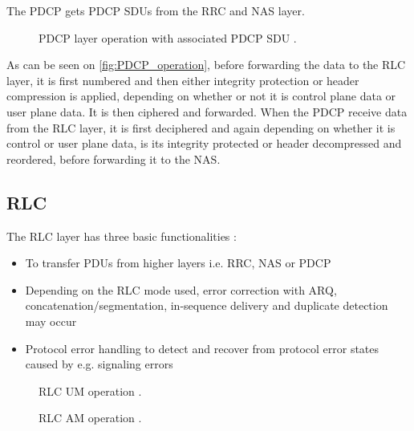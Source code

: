 The \gls{PDCP} gets \gls{PDCP} \gls{SDU}s from the \gls{RRC} and \gls{NAS} layer. 

\begin{figure}[H]
\centering
\resizebox{0.8\textwidth}{!}{
}
\caption{\gls{PDCP} layer operation with associated \gls{PDCP} \gls{SDU} \citep[fig. 6.12]{book_LTE_for_UMTS}.}
\label{fig:PDCP_operation}
\end{figure}

As can be seen on \autoref{fig:PDCP_operation}, before forwarding the data to the \gls{RLC} layer, it is first numbered and then either integrity protection or header compression is applied, depending on whether or not it is control plane data or user plane data. It is then ciphered and forwarded. When the \gls{PDCP} receive data from the \gls{RLC} layer, it is first deciphered and again depending on whether it is control or user plane data, is its integrity protected or header decompressed and reordered, before forwarding it to the \gls{NAS}. \citep[ch. 6.5]{book_LTE_for_UMTS}  


\subsection{RLC}

The \gls{RLC} layer has three basic functionalities \cite[ch. 6.4]{book_LTE_for_UMTS}:

\begin{itemize}
    \item To transfer \gls{PDU}s from higher layers i.e. \gls{RRC}, \gls{NAS} or \gls{PDCP}
    \item Depending on the \gls{RLC} mode used, error correction with \gls{ARQ}, concatenation/segmentation, in-sequence delivery and duplicate detection may occur
    \item Protocol error handling to detect and recover from protocol error states caused by e.g. signaling errors
\end{itemize}

\captionsetup{belowskip=0em}
\begin{minipage}[H]{0.48\textwidth}
\begin{figure}[H]
\centering
\resizebox{\textwidth}{!}{
}
\caption{\gls{RLC} \gls{UM} operation \citep[ch. 6.4]{book_LTE_for_UMTS}.}
\label{fig:RLC_AM/UM_operation2}
\end{figure}
\end{minipage}
\begin{minipage}[H]{0.48\textwidth}
\begin{figure}[H]
\centering
\resizebox{\textwidth}{!}{
}
\caption{\gls{RLC} \gls{AM} operation \citep[ch. 6.4]{book_LTE_for_UMTS}.}
\label{fig:RLC_AM/UM_operation}
\end{figure}
\end{minipage}
\captionsetup{belowskip=-1.5em}


